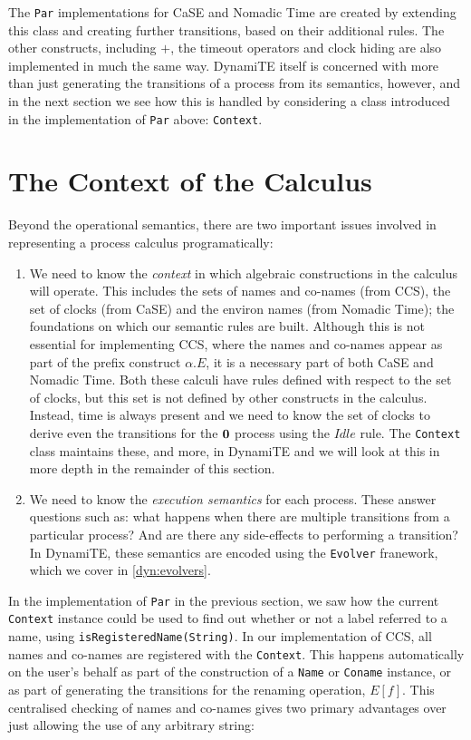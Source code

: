 The \texttt{Par} implementations for CaSE and Nomadic Time are created
by extending this class and creating further transitions, based on
their additional rules.  The other constructs, including $+$, the
timeout operators and clock hiding are also implemented in much the
same way.  DynamiTE itself is concerned with more than just generating
the transitions of a process from its semantics, however, and in the
next section we see how this is handled by considering a class
introduced in the implementation of \texttt{Par} above:
\texttt{Context}.

\section{The Context of the Calculus}
\label{dyn:context}

Beyond the operational semantics, there are two important issues
involved in representing a process calculus programatically:

\begin{enumerate}
\item We need to know the \emph{context} in which algebraic
  constructions in the calculus will operate.  This includes the sets
  of names and co-names (from CCS), the set of clocks (from CaSE) and
  the environ names (from Nomadic Time); the foundations on which our
  semantic rules are built.  Although this is not essential for
  implementing CCS, where the names and co-names appear as part of the
  prefix construct $\alpha.E$, it is a necessary part of both CaSE and
  Nomadic Time.  Both these calculi have rules defined with respect to
  the set of clocks, but this set is not defined by other constructs
  in the calculus.  Instead, time is always present and we need to
  know the set of clocks to derive even the transitions for the $\textbf{0}$
  process using the $Idle$ rule.  The \texttt{Context} class maintains
  these, and more, in DynamiTE and we will look at this in more depth
  in the remainder of this section.
\item We need to know the \emph{execution semantics} for each process.
  These answer questions such as: what happens when there are multiple
  transitions from a particular process? And are there any
  side-effects to performing a transition?  In DynamiTE, these
  semantics are encoded using the \texttt{Evolver} franework, which we
  cover in \ref{dyn:evolvers}.
\end{enumerate}

In the implementation of \texttt{Par} in the previous section, we saw
how the current \texttt{Context} instance could be used to find out
whether or not a label referred to a name, using
\texttt{isRegisteredName(String)}.  In our implementation of CCS, all
names and co-names are registered with the \texttt{Context}.  This
happens automatically on the user's behalf as part of the construction
of a \texttt{Name} or \texttt{Coname} instance, or as part of
generating the transitions for the renaming operation, $E[f]$.  This
centralised checking of names and co-names gives two primary
advantages over just allowing the use of any arbitrary string:

